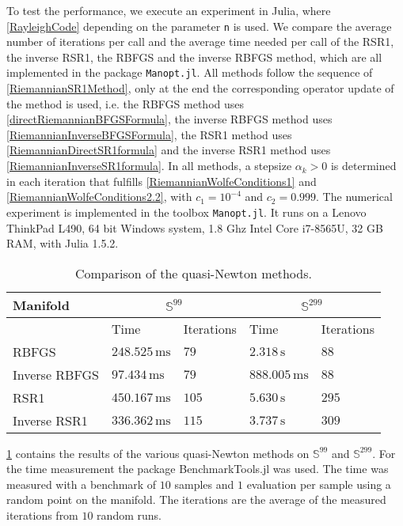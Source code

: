 To test the performance, we execute an experiment in Julia, where \cref{RayleighCode} depending on the parameter \lstinline!n! is used. We compare the average number of iterations per call and the average time needed per call of the RSR1, the inverse RSR1, the RBFGS and the inverse RBFGS method, which are all implemented in the package \lstinline!Manopt.jl!. All methods follow the sequence of \cref{RiemannianSR1Method}, only at the end the corresponding operator update of the method is used, i.e. the RBFGS method uses \cref{directRiemannianBFGSFormula}, the inverse RBFGS method uses \cref{RiemannianInverseBFGSFormula}, the RSR1 method uses \cref{RiemannianDirectSR1formula} and the inverse RSR1 method uses \cref{RiemannianInverseSR1formula}. In all methods, a stepsize $\alpha_k > 0$ is determined in each iteration that fulfills \cref{RiemannianWolfeConditions1} and \cref{RiemannianWolfeConditions2.2}, with $c_1 = 10^{−4}$ and $c_2 = 0.999$. The numerical experiment is implemented in the toolbox \lstinline!Manopt.jl!. It runs on a Lenovo ThinkPad L490, 64 bit Windows system, 1.8 Ghz Intel Core i7-8565U, 32 GB RAM, with Julia 1.5.2.
\begin{table}[H]\label{tab:Results}
    \center
        \begin{tabular}{l l l l l }
            \toprule
            Manifold & \multicolumn{2}{c}{$\mathbb{S}^{99}$} & \multicolumn{2}{c}{$\mathbb{S}^{299}$}   \\ 
            \midrule
            & Time & Iterations & Time & Iterations  \\ 
            \midrule
            RBFGS & $248.525 \, \mathrm{ms}$ & $79$ & $2.318 \, \mathrm{s}$ & $88$  \\ 
            \midrule
            Inverse RBFGS & $97.434 \, \mathrm{ms}$ & $79$ & $888.005 \, \mathrm{ms}$ & $88$   \\
            \midrule
            RSR1 & $450.167 \, \mathrm{ms}$ & $105$ & $5.630 \, \mathrm{s}$ & $295$  \\ 
            \midrule
            Inverse RSR1 & $336.362 \, \mathrm{ms}$ & $115$ & $3.737 \, \mathrm{s}$ & $309$   \\
            \bottomrule
        \end{tabular}

    \caption{Comparison of the quasi-Newton methods.}
\end{table}
\cref{tab:Results} contains the results of the various quasi-Newton methods on $\mathbb{S}^{99}$ and $\mathbb{S}^{299}$. For the time measurement the package BenchmarkTools.jl was used. The time was measured with a benchmark of $10$ samples and $1$ evaluation per sample using a random point on the manifold. The iterations are the average of the measured iterations from $10$ random runs. \\
